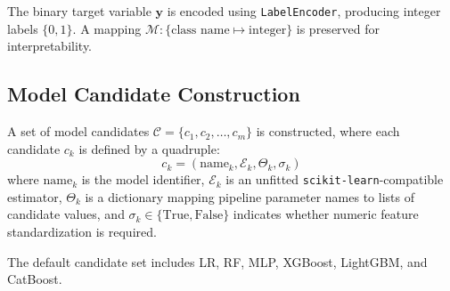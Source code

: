 \documentclass[diagnostics,article,accept,pdftex,moreauthors]{Definitions/mdpi}
\begin{document}
The binary target variable $\mathbf{y}$ is encoded using
\texttt{LabelEncoder}, producing integer labels $\{0, 1\}$. A mapping
$\mathcal{M}: \{\text{class name} \mapsto \text{integer}\}$ is
preserved for interpretability.

\subsection[\appendixname~\thesubsection]{Model Candidate
  Construction}
A set of model candidates $\mathcal{C} = \{c_1, c_2, \ldots, c_m\}$ is
constructed, where each candidate $c_k$ is defined by a quadruple:
\[
c_k = (\text{name}_k, \mathcal{E}_k, \Theta_k, \sigma_k)
\]
where $\text{name}_k$ is the model identifier, $\mathcal{E}_k$ is an
unfitted \texttt{scikit-learn}-compatible estimator, $\Theta_k$ is a
dictionary mapping pipeline parameter names to lists of candidate
values, and $\sigma_k \in \{\text{True}, \text{False}\}$ indicates
whether numeric feature standardization is required.

The default candidate set includes \ac{LR}, \ac{RF}, \ac{MLP},
XGBoost, LightGBM, and CatBoost.
\end{document}
